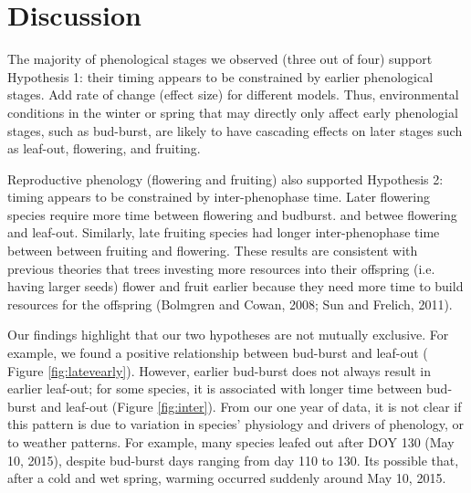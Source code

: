 \documentclass{article}
\begin{document}
\section* {Discussion}
\par The majority of phenological stages we observed (three out of four) support Hypothesis 1: their timing appears to be constrained by earlier phenological stages.  Add rate of change (effect size) for different models. Thus, environmental conditions in the winter or spring that may directly only affect early phenologial stages, such as bud-burst, are likely to have cascading effects on later stages such as leaf-out, flowering, and fruiting. 
\par Reproductive phenology (flowering and fruiting) also supported Hypothesis 2: timing appears to be constrained by inter-phenophase time. Later flowering species require more time between flowering and budburst.%
and betwee flowering and leaf-out. %
Similarly, late fruiting species had longer inter-phenophase time between between fruiting and flowering.%
These results are consistent with previous theories that trees investing more resources into their offspring (i.e. having larger seeds) flower and fruit earlier because they need more time to build resources for the offspring (Bolmgren and Cowan, 2008; Sun and Frelich, 2011).
\par Our findings highlight that our two hypotheses are not mutually exclusive. For example, we found a positive relationship between bud-burst and leaf-out ( Figure \ref{fig:latevearly}). However, earlier bud-burst does not always result in earlier leaf-out; for some species, it is associated with longer time between bud-burst and leaf-out (Figure \ref{fig:inter}). From our one year of data, it is not clear if this pattern is due to variation in species' physiology and drivers of phenology, or to weather patterns. For example, many species leafed out after DOY 130 (May 10, 2015), despite bud-burst days ranging from day 110 to 130. Its possible that, after a cold and wet spring, warming occurred suddenly around May 10, 2015. 
  
\end{document}
